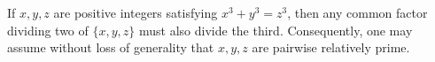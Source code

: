 If $x, y, z$ are positive integers satisfying $x^3 + y^3 = z^3$, then any common factor dividing two of $\{x, y, z\}$ must also divide the third. Consequently, one may assume without loss of generality that $x, y, z$ are pairwise relatively prime.
